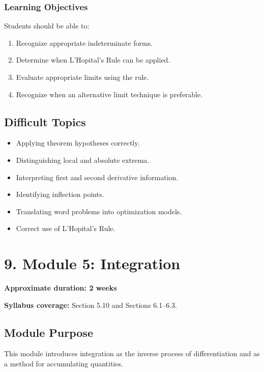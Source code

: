 \documentclass[11pt]{article}
\begin{document}
\subsubsection{Learning Objectives}

Students should be able to:

\begin{enumerate}
    \item Recognize appropriate indeterminate forms.
    \item Determine when L'Hopital's Rule can be applied.
    \item Evaluate appropriate limits using the rule.
    \item Recognize when an alternative limit technique is preferable.
\end{enumerate}

\subsection{Difficult Topics}

\begin{itemize}
    \item Applying theorem hypotheses correctly.
    \item Distinguishing local and absolute extrema.
    \item Interpreting first and second derivative information.
    \item Identifying inflection points.
    \item Translating word problems into optimization models.
    \item Correct use of L'Hopital's Rule.
\end{itemize}

\section{9. Module 5: Integration}

\textbf{Approximate duration: 2 weeks}

\textbf{Syllabus coverage:} Section 5.10 and Sections 6.1--6.3.

\subsection{Module Purpose}

This module introduces integration as the inverse process of differentiation
and as a method for accumulating quantities.
\end{document}
